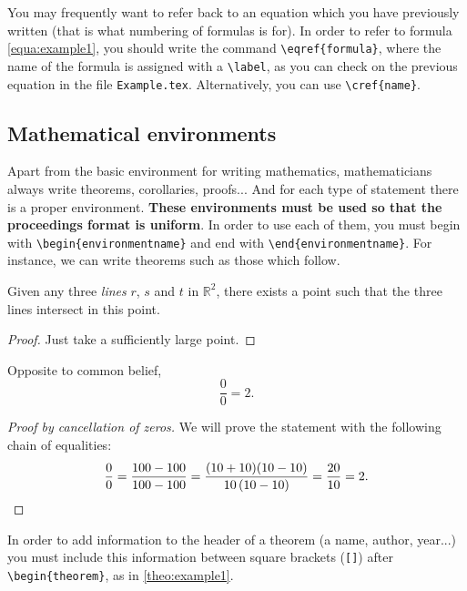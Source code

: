 \documentclass[babel-main=english]{TEMat-article}
\begin{document}
You may frequently want to refer back to an equation which you have previously written (that is what numbering of formulas is for).
In order to refer to formula \eqref{equa:example1}, you should write the command \verb+\eqref{formula}+, where the name of the formula is assigned with a \verb+\label+, as you can check on the previous equation in the file \verb+Example.tex+.
Alternatively, you can use \verb+\cref{name}+.

\subsection{Mathematical environments}

Apart from the basic environment for writing mathematics, mathematicians always write theorems, corollaries, proofs...
And for each type of statement there is a proper environment.
\textbf{These environments must be used so that the proceedings format is uniform}.
In order to use each of them, you must begin with \verb+\begin{environmentname}+ and end with \verb+\end{environmentname}+.
For instance, we can write theorems such as those which follow.

\begin{theorem}\label{theo:example1}
Given any three \emph{lines} $r$,\/ $s$ and\/ $t$ in\/ $\mathbb{R}^2$, there exists a point such that the three lines intersect in this point.
\end{theorem}

\begin{proof}
Just take a sufficiently large point.
\end{proof}

\begin{theorem}\label{theo:example2}
Opposite to common belief,
\[\frac{0}{0}=2.\]
\end{theorem}

\begin{proof}[Proof by cancellation of zeros]
We will prove the statement with the following chain of equalities:
\[\frac{0}{0}=\frac{100-100}{100-100}=\frac{(10+10)(10-10)}{10\,(10-10)}=\frac{20}{10}=2.\qedhere\]
\end{proof}

In order to add information to the header of a theorem (a name, author, year...) you must include this information between square brackets (\verb+[]+) after \verb+\begin{theorem}+, as in \autoref{theo:example1}.
\end{document}
